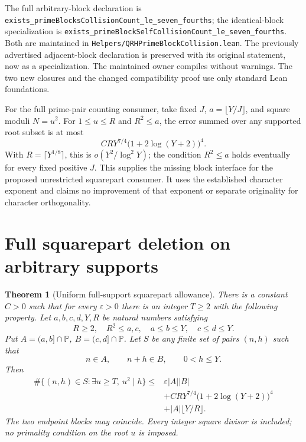 \documentclass[11pt]{article}
\newtheorem{theorem}{Theorem}[section]
\begin{document}
The full arbitrary-block declaration is
\texttt{exists\_primeBlocksCollisionCount\_le\_seven\_fourths};
the identical-block specialization is
\texttt{exists\_primeBlockSelfCollisionCount\_le\_seven\_fourths}.
Both are maintained in
\texttt{Helpers/\allowbreak QRHPrimeBlockCollision.\allowbreak lean}.
The previously advertised adjacent-block declaration is
preserved with its original statement, now as a specialization.
The maintained owner compiles without warnings.
The two new closures and the changed compatibility proof use
only standard Lean foundations.

For the full prime-pair counting consumer, take fixed \(J\),
\(a=\lfloor Y/J\rfloor\), and square moduli \(N=u^2\).
For \(1\le u\le R\) and \(R^2\le a\), the error summed over
any supported root subset is at most
\[
 CRY^{7/4}\bigl(1+2\log(Y+2)\bigr)^4.
\]
With \(R=\lceil Y^{1/8}\rceil\), this is
\(o(Y^2/\log^2Y)\); the condition \(R^2\le a\) holds
eventually for every fixed positive \(J\).
This supplies the missing block interface for the proposed
unrestricted squarepart consumer. It uses the established
character exponent and claims no improvement of that exponent
or separate originality for character orthogonality.

\section{Full squarepart deletion on arbitrary supports}
\label{sec:native-full-support-squarepart}

\begin{theorem}[Uniform full-support squarepart allowance]
\label{thm:native-full-support-squarepart}
There is a constant \(C>0\) such that for every
\(\varepsilon>0\) there is an integer \(T\ge2\) with
the following property. Let \(a,b,c,d,Y,R\) be natural
numbers satisfying
\[
 R\ge2,\quad R^2\le a,c,\quad a\le b\le Y,\quad c\le d\le Y.
\]
Put \(A=(a,b]\cap\mathbb P\), \(B=(c,d]\cap\mathbb P\).
Let \(S\) be any finite set of pairs \((n,h)\) such that
\[
 n\in A,\qquad n+h\in B,\qquad 0<h\le Y.
\]
Then
\[
 \begin{split}
 \#\{(n,h)\in S:\exists u\ge T,\ u^2\mid h\}
 \le{}&\varepsilon |A||B|\\
 &+CRY^{7/4}\bigl(1+2\log(Y+2)\bigr)^4\\
 &+|A|\lfloor Y/R\rfloor.
 \end{split}
\]
The two endpoint blocks may coincide.
Every integer square divisor is included; no primality
condition on the root \(u\) is imposed.
\end{theorem}
\end{document}

